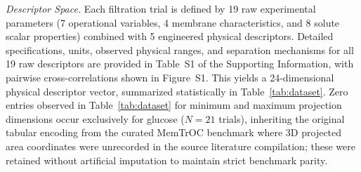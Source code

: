 \documentclass[11pt]{article}
\begin{document}
\textit{Descriptor Space.} Each filtration trial is defined by 19 raw experimental parameters (7 operational variables, 4 membrane characteristics, and 8 solute scalar properties) combined with 5 engineered physical descriptors. Detailed specifications, units, observed physical ranges, and separation mechanisms for all 19 raw descriptors are provided in Table~S1 of the Supporting Information, with pairwise cross-correlations shown in Figure~S1. This yields a 24-dimensional physical descriptor vector, summarized statistically in Table~\ref{tab:dataset}. Zero entries observed in Table~\ref{tab:dataset} for minimum and maximum projection dimensions occur exclusively for glucose ($N = 21$ trials), inheriting the original tabular encoding from the curated MemTrOC benchmark \cite{xiao2026} where 3D projected area coordinates were unrecorded in the source literature compilation; these were retained without artificial imputation to maintain strict benchmark parity.
\end{document}
